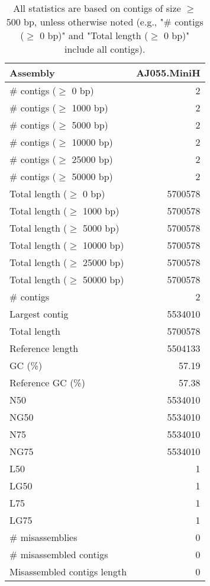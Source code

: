 \documentclass[12pt,a4paper]{article}
\begin{document}
\begin{table}[ht]
\begin{center}
\caption{All statistics are based on contigs of size $\geq$ 500 bp, unless otherwise noted (e.g., "\# contigs ($\geq$ 0 bp)" and "Total length ($\geq$ 0 bp)" include all contigs).}
\begin{tabular}{|l*{1}{|r}|}
\hline
Assembly & AJ055.MiniH \\ \hline
\# contigs ($\geq$ 0 bp) & 2 \\ \hline
\# contigs ($\geq$ 1000 bp) & 2 \\ \hline
\# contigs ($\geq$ 5000 bp) & 2 \\ \hline
\# contigs ($\geq$ 10000 bp) & 2 \\ \hline
\# contigs ($\geq$ 25000 bp) & 2 \\ \hline
\# contigs ($\geq$ 50000 bp) & 2 \\ \hline
Total length ($\geq$ 0 bp) & 5700578 \\ \hline
Total length ($\geq$ 1000 bp) & 5700578 \\ \hline
Total length ($\geq$ 5000 bp) & 5700578 \\ \hline
Total length ($\geq$ 10000 bp) & 5700578 \\ \hline
Total length ($\geq$ 25000 bp) & 5700578 \\ \hline
Total length ($\geq$ 50000 bp) & 5700578 \\ \hline
\# contigs & 2 \\ \hline
Largest contig & 5534010 \\ \hline
Total length & 5700578 \\ \hline
Reference length & 5504133 \\ \hline
GC (\%) & 57.19 \\ \hline
Reference GC (\%) & 57.38 \\ \hline
N50 & 5534010 \\ \hline
NG50 & 5534010 \\ \hline
N75 & 5534010 \\ \hline
NG75 & 5534010 \\ \hline
L50 & 1 \\ \hline
LG50 & 1 \\ \hline
L75 & 1 \\ \hline
LG75 & 1 \\ \hline
\# misassemblies & 0 \\ \hline
\# misassembled contigs & 0 \\ \hline
Misassembled contigs length & 0 \\ \hline

\end{tabular}
\end{center}
\end{table}
\end{document}
